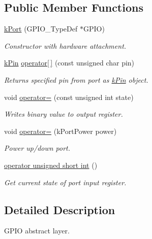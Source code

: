 \subsection*{Public Member Functions}
\begin{DoxyCompactItemize}
\item 
\hyperlink{classkPort_a6db4d381fe6fc493c8fc50f5d380f573}{k\+Port} (G\+P\+I\+O\+\_\+\+Type\+Def $\ast$G\+P\+IO)
\begin{DoxyCompactList}\small\item\em Constructor with hardware attachment. \end{DoxyCompactList}\item 
\hyperlink{classkPin}{k\+Pin} \hyperlink{classkPort_a9f3131f77223e20c20522735772feb9a}{operator\mbox{[}$\,$\mbox{]}} (const unsigned char pin)
\begin{DoxyCompactList}\small\item\em Returns specified pin from port as \hyperlink{classkPin}{k\+Pin} object. \end{DoxyCompactList}\item 
void \hyperlink{classkPort_a91af78d57b086ffa8d983613439c560d}{operator=} (const unsigned int state)
\begin{DoxyCompactList}\small\item\em Writes binary value to output register. \end{DoxyCompactList}\item 
void \hyperlink{classkPort_afd6cd584e0e2ca0b33081f8ad51d54b9}{operator=} (k\+Port\+Power power)
\begin{DoxyCompactList}\small\item\em Power up/down port. \end{DoxyCompactList}\item 
\hyperlink{classkPort_a1ef90399e4f9698f129bae524f3d0880}{operator unsigned short int} ()\hypertarget{classkPort_a1ef90399e4f9698f129bae524f3d0880}{}\label{classkPort_a1ef90399e4f9698f129bae524f3d0880}

\begin{DoxyCompactList}\small\item\em Get current state of port input register. \end{DoxyCompactList}\end{DoxyCompactItemize}


\subsection{Detailed Description}
G\+P\+IO abstract layer. 

